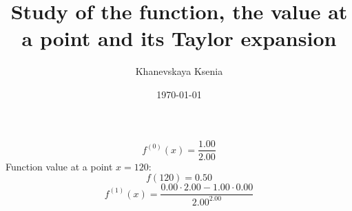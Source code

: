 \documentclass[12pt, letterpaper]{article}
\title {Study of the function, the value at a point and its Taylor expansion}
\author{Khanevskaya Ksenia}
\date{\today}
\begin{document}
\maketitle
\[f^{(0)}(x)=\frac{1.00}{2.00}\]
Function value at a point $x=120$: \[f(120)=0.50\]
\[f^{(1)}(x)=\frac{0.00\cdot2.00-1.00\cdot0.00}{2.00^{2.00}}\]
\end{document}
